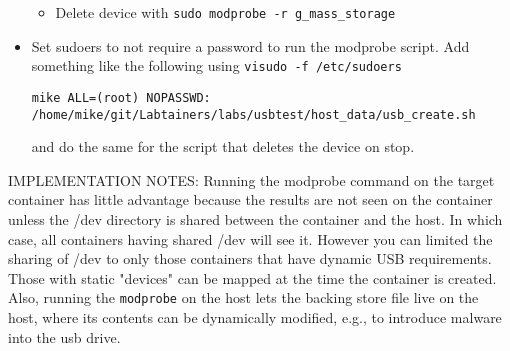 \documentclass[12pt]{article}
\begin{document}
\begin{itemize}
\begin{itemize}
\item Delete device with {\tt sudo modprobe -r g\_mass\_storage}

\end{itemize}

\item Set sudoers to not require a password to run the modprobe script.  Add
something like the following using {\tt visudo -f /etc/sudoers}
\begin{verbatim}
mike ALL=(root) NOPASSWD: /home/mike/git/Labtainers/labs/usbtest/host_data/usb_create.sh
\end{verbatim}
\noindent and do the same for the script that deletes the device on stop.

\end{itemize}

IMPLEMENTATION NOTES:   Running the modprobe command on the target container has little advantage because the results
are not seen on the container unless the /dev directory is shared between the container and the host.  In which case,
all containers having shared /dev will see it.  However you can limited the sharing of /dev to only those containers
that have dynamic USB requirements.  Those with static "devices" can be mapped at the time the container is created.
Also, running the {\tt modprobe} on the host lets the backing store file live on the host, where its contents can be
dynamically modified, e.g., to introduce malware into the usb drive.
\end{document}
